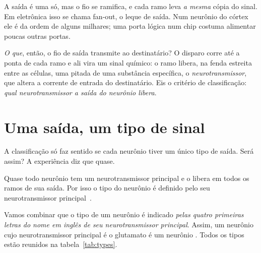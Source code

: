 A saída é uma só, mas o fio se ramifica, e cada ramo leva \emph{a mesma} cópia do sinal. Em eletrônica isso se chama fan-out, o leque de saída. Num neurônio do córtex ele é da ordem de alguns milhares; uma porta lógica num chip costuma alimentar poucas outras portas.

\emph{O que}, então, o fio de saída transmite ao destinatário? O disparo corre até a ponta de cada ramo e ali vira um sinal químico: o ramo libera, na fenda estreita entre as células, uma pitada de uma substância específica, o \emph{neurotransmissor}, que altera a corrente de entrada do destinatário. Eis o critério de classificação: \emph{qual neurotransmissor a saída do neurônio libera}.

\section{Uma saída, um tipo de sinal}

A classificação só faz sentido se cada neurônio tiver um único tipo de saída. Será assim? A experiência diz que quase.

\begin{keyblock}
\begin{proposition}
\label{prop:dale}
Quase todo neurônio tem um neurotransmissor principal e o libera em todos os ramos de sua saída. Por isso o tipo do neurônio é definido pelo seu neurotransmissor principal~\cite{Strata1999}.
\end{proposition}
\end{keyblock}

Vamos combinar que o tipo de um neurônio é indicado \emph{pelas quatro primeiras letras do nome em inglês de seu neurotransmissor principal}. Assim, um neurônio cujo neurotransmissor principal é o glutamato é um neurônio . Todos os tipos estão reunidos na tabela~\ref{tab:types}.

